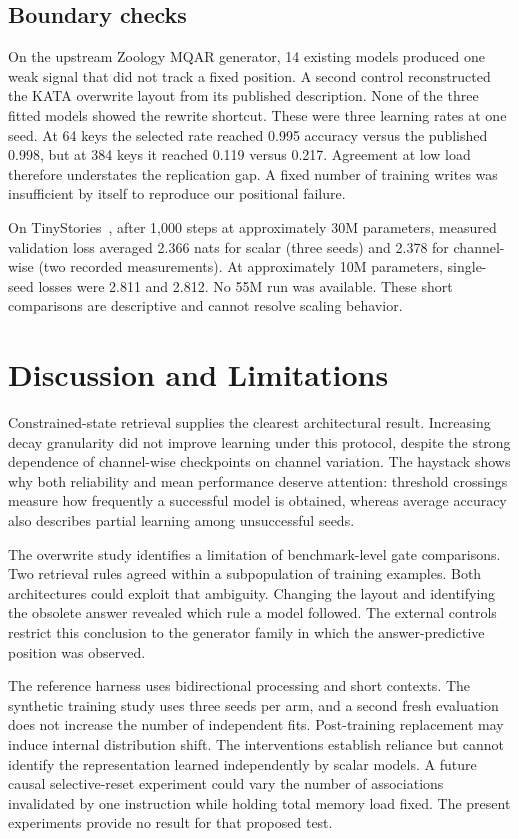 \documentclass[conference]{IEEEtran}
\begin{document}
\subsection{Boundary checks}
On the upstream Zoology MQAR generator, 14 existing models produced one weak signal that did not track a fixed position. A second control reconstructed the KATA overwrite layout from its published description. None of the three fitted models showed the rewrite shortcut. These were three learning rates at one seed. At 64 keys the selected rate reached 0.995 accuracy versus the published 0.998, but at 384 keys it reached 0.119 versus 0.217. Agreement at low load therefore understates the replication gap. A fixed number of training writes was insufficient by itself to reproduce our positional failure.

On TinyStories~\cite{tiny}, after 1,000 steps at approximately 30M parameters, measured validation loss averaged 2.366 nats for scalar (three seeds) and 2.378 for channel-wise (two recorded measurements). At approximately 10M parameters, single-seed losses were 2.811 and 2.812. No 55M run was available. These short comparisons are descriptive and cannot resolve scaling behavior.
\section{Discussion and Limitations}
Constrained-state retrieval supplies the clearest architectural result. Increasing decay granularity did not improve learning under this protocol, despite the strong dependence of channel-wise checkpoints on channel variation. The haystack shows why both reliability and mean performance deserve attention: threshold crossings measure how frequently a successful model is obtained, whereas average accuracy also describes partial learning among unsuccessful seeds.

The overwrite study identifies a limitation of benchmark-level gate comparisons. Two retrieval rules agreed within a subpopulation of training examples. Both architectures could exploit that ambiguity. Changing the layout and identifying the obsolete answer revealed which rule a model followed. The external controls restrict this conclusion to the generator family in which the answer-predictive position was observed.

The reference harness uses bidirectional processing and short contexts. The synthetic training study uses three seeds per arm, and a second fresh evaluation does not increase the number of independent fits. Post-training replacement may induce internal distribution shift. The interventions establish reliance but cannot identify the representation learned independently by scalar models. A future causal selective-reset experiment could vary the number of associations invalidated by one instruction while holding total memory load fixed. The present experiments provide no result for that proposed test.
\end{document}

